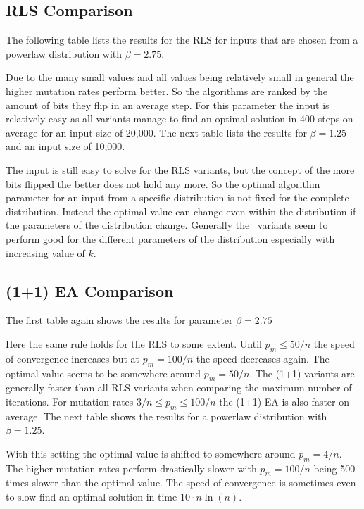 \subsection{RLS Comparison}
The following table lists the results for the RLS for inputs that are chosen from a powerlaw distribution with $\beta=2.75$.




Due to the many small values and all values being relatively small in general the higher mutation rates perform better.
So the algorithms are ranked by the amount of bits they flip in an average step.
For this parameter the input is relatively easy as all variants manage to find an optimal solution in 400 steps on average for an input size of 20,000.
The next table lists the results for $\beta=1.25$ and an input size of 10,000.



The input is still easy to solve for the RLS variants, but the concept of the more bits flipped the better does not hold any more.
So the optimal algorithm parameter for an input from a specific distribution is not fixed for the complete distribution.
Instead the optimal value can change even within the distribution if the parameters of the distribution change.
Generally the \RLSR~variants seem to perform good for the different parameters of the distribution especially with increasing value of $k$.
\subsection{(1+1) EA Comparison}
The first table again shows the results for parameter $\beta=2.75$



Here the same rule holds for the RLS to some extent.
Until $p_m\le50/n$ the speed of convergence increases but at $p_m=100/n$ the speed decreases again.
The optimal value seems to be somewhere around $p_m=50/n$.
The (1+1) variants are generally faster than all RLS variants when comparing the maximum number of iterations.
For mutation rates $3/n\le p_m \le 100/n$ the (1+1) EA is also faster on average.
The next table shows the results for a powerlaw distribution with $\beta=1.25$.



With this setting the optimal value is shifted to somewhere around $p_m=4/n$.
The higher mutation rates perform drastically slower with $p_m=100/n$ being 500 times slower than the optimal value.
The speed of convergence is sometimes even to slow find an optimal solution in time $10\cdot n\ln(n)$.
